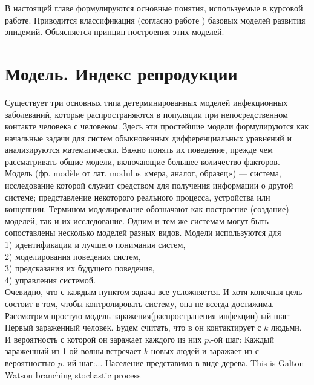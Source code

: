 
В настоящей главе формулируются основные понятия, используемые в курсовой работе. Приводится классификация (согласно работе \cite{SI.SIS.SIR}) базовых моделей развития эпидемий. Объясняется принцип построения этих моделей.

\section{Модель. Индекс репродукции}\label{1sec:model.R0}
Существует три основных типа детерминированных моделей инфекционных заболеваний, которые распространяются в популяции при непосредственном контакте человека с человеком. Здесь эти простейшие модели формулируются как начальные задачи для систем обыкновенных дифференциальных уравнений и анализируются математически. Важно понять их поведение, прежде чем рассматривать общие модели, включающие большее количество факторов.\newline
Модель (фр. modèle от лат. modulus «мера, аналог, образец») — система, исследование которой служит средством для получения информации о другой системе\cite{Uemov}; представление некоторого реального процесса, устройства или концепции\cite{SSE.Vocabulary}.
Термином моделирование обозначают как построение (создание) моделей, так и их исследование.
Одним и тем же системам могут быть сопоставлены несколько моделей разных видов. 
  Модели используются для\\
1) идентификации и лучшего понимания систем,\\
2) моделирования поведения систем,\\
3) предсказания их будущего поведения,\\
4) управления системой.\\
Очевидно, что с каждым пунктом задача все усложняется. И хотя конечная цель состоит в том, чтобы контролировать систему, она не всегда достижима.
Рассмотрим простую модель заражения(распространения инфекции)-ый шаг: Первый зараженный человек. Будем считать, что в он контактирует с $k$ людьми. И вероятность с которой он заражает каждого из них $p$.-ой шаг: Каждый зараженный из 1-ой волны встречает $k$ новых людей и заражает из с вероятностью $p$.-ий шаг:...
Население представимо в виде дерева. 
This is Galton-Watson branching stochastic process


